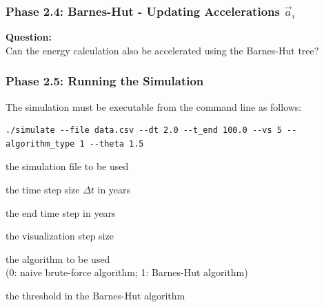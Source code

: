 \begin{frame}[fragile]
  \frametitle{Phase 2.4: Barnes-Hut - Updating Accelerations $\vec{a}_i$}
  \begin{algorithmcl}
    \begin{algorithmic}[1]
                \Else
                    \EndFor
                \EndIf
                \EndProcedure
    \end{algorithmic}
    \end{algorithmcl}
    \vfill
    \textbf{Question:} \\
    Can the energy calculation also be accelerated using the Barnes-Hut tree?
\end{frame}

\begin{frame}[fragile]
    \frametitle{Phase 2.5: Running the Simulation}

    The simulation must be executable from the command line as follows:
    \begin{verbatim}
./simulate --file data.csv --dt 2.0 --t_end 100.0 --vs 5 --algorithm_type 1 --theta 1.5
    \end{verbatim}
    
    \begin{description}[labelwidth=\widthof{\bfseries \texttt{--theta}}]
        \item[\texttt{--file}] the simulation file to be used
        \item[\texttt{--dt}] the time step size $\Delta t$ in years
        \item[\texttt{--t\_end}] the end time step in years
        \item[\texttt{--vs}] the visualization step size
        \item[\texttt{--algorithm\_type}] the algorithm to be used \\
        (0: naive brute-force algorithm; 1: Barnes-Hut algorithm)
        \item[\texttt{--theta}] the threshold in the Barnes-Hut algorithm
    \end{description}
    \vfill
\end{frame}

